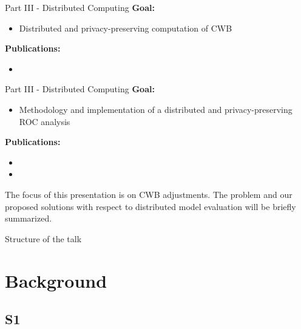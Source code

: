 \documentclass[10pt]{beamer}
\begin{document}
\begin{frame}{Part III - Distributed Computing}
  \textbf{Goal:}
  \begin{itemize}
    \item
      Distributed and privacy-preserving computation of CWB
  \end{itemize}


  \textbf{Publications:}
  \renewcommand{\newblock}{\newblocknew}
  \begin{itemize}
    \item {\footnotesize{}}
  \end{itemize}
  \renewcommand{\newblock}{\newblockold}

\end{frame}

\begin{frame}{Part III - Distributed Computing}
  \textbf{Goal:}
  \begin{itemize}
    \item
      Methodology and implementation of a distributed and privacy-preserving ROC analysis
  \end{itemize}

  \textbf{Publications:}
  \renewcommand{\newblock}{\newblocknew}
  \begin{itemize}
    \item {\footnotesize{}}
    \item {\footnotesize{}}
  \end{itemize}
  \renewcommand{\newblock}{\newblockold}

  The focus of this presentation is on CWB adjustments. The problem and our proposed solutions with respect to distributed model evaluation will be briefly summarized.
\end{frame}



\begin{frame}{Structure of the talk}
  \tableofcontents
\end{frame}

\section{Background}
\subsection{S1}
\end{document}
